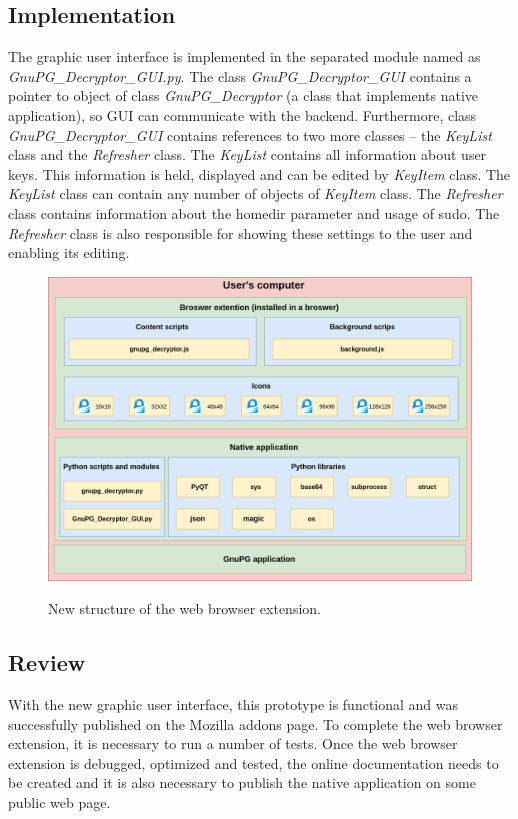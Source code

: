 \subsection{Implementation}
The graphic user interface is implemented in the separated module named as \\ \textit{GnuPG\_Decryptor\_GUI.py}. The class \textit{GnuPG\_Decryptor\_GUI} contains a pointer to object of class \textit{GnuPG\_Decryptor} (a class that implements native application), so GUI can communicate with the backend. Furthermore, class \textit{GnuPG\_Decryptor\_GUI} contains references to two more classes -- the \textit{KeyList} class and the \textit{Refresher} class. The \textit{KeyList} contains all information about user keys. This information is held, displayed and can be edited by \textit{KeyItem} class. The \textit{KeyList} class can contain any number of objects of \textit{KeyItem} class. The \textit{Refresher} class contains information about the homedir parameter and usage of sudo. The \textit{Refresher} class is also responsible for showing these settings to the user and enabling its editing.

\begin{figure}[H]
    \begin{center}
        \label{img:guiPrototypeAnatomy}
        \includegraphics[width=1.0\textwidth]{obrazky-figures/prototype-GUI.png}
        \caption{New structure of the web browser extension.}
    \end{center}
\end{figure}

\subsection{Review}
With the new graphic user interface, this prototype is functional and was successfully published on the Mozilla addons page. To complete the web browser extension, it is necessary to run a number of tests. Once the web browser extension is debugged, optimized and tested, the online documentation needs to be created and it is also necessary to publish the native application on some public web page.

